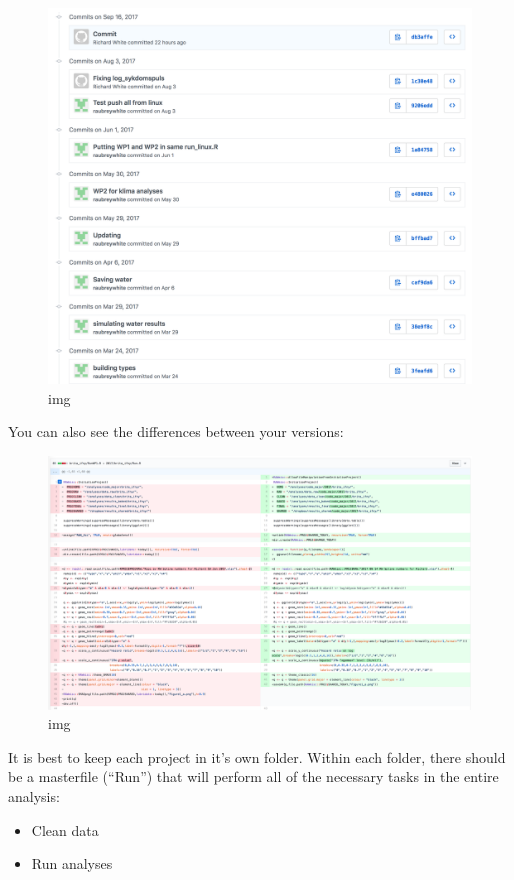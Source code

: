 \documentclass[12pt,]{article}
\providecommand{\tightlist}{%
  \setlength{\itemsep}{0pt}\setlength{\parskip}{0pt}}
\begin{document}
\begin{figure}
\centering
\includegraphics{resources/git_commit.png}
\caption{img}
\end{figure}

You can also see the differences between your versions:

\begin{figure}
\centering
\includegraphics{resources/git_changes.png}
\caption{img}
\end{figure}

It is best to keep each project in it's own folder. Within each folder,
there should be a masterfile (``Run'') that will perform all of the
necessary tasks in the entire analysis:

\begin{itemize}
\tightlist
\item
  Clean data
\item
  Run analyses
\end{itemize}
\end{document}
